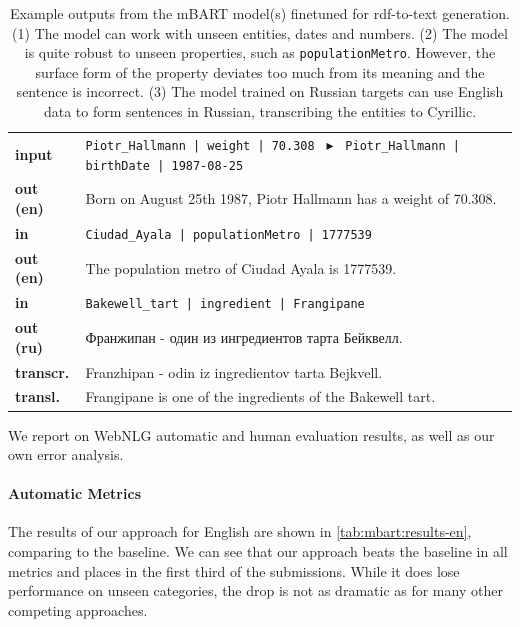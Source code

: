 \begin{table}[t]
    \footnotesize
    \centering
    \begin{tabular}{@{}lp{12.7cm}@{}}
        \textbf{input}    & \texttt{Piotr\_Hallmann | weight | 70.308 }  $\blacktriangleright$ \texttt{ Piotr\_Hallmann | birthDate | 1987-08-25} \\
        \textbf{out (en)} & Born on August 25th 1987, Piotr Hallmann has a weight of 70.308.                                                      \\
        \midrule
        \textbf{in}       & \texttt{Ciudad\_Ayala | populationMetro | 1777539}                                                                    \\
        \textbf{out (en)} & The population metro of Ciudad Ayala is 1777539.                                                                      \\
        \midrule
        \textbf{in}       & \texttt{Bakewell\_tart | ingredient | Frangipane}                                                                     \\
        \textbf{out (ru)} & Франжипан - один из ингредиентов тарта Бейквелл.                                                                      \\[0.1cm]
        \textbf{transcr.} & Franzhipan - odin iz ingredientov tarta Bejkvell.                                                                     \\
        \textbf{transl.}  & Frangipane is one of the ingredients of the Bakewell tart.                                                            \\
    \end{tabular}
    \caption{Example outputs from the mBART model(s) finetuned for \ac{rdf}-to-text generation. (1) The model can work with unseen entities, dates and numbers. (2) The model is quite robust to unseen properties, such as \texttt{populationMetro}. However, the surface form of the property deviates too much from its meaning and the sentence is incorrect. (3) The model trained on Russian targets can use English data to form sentences in Russian, transcribing the entities to Cyrillic.}
    \label{tab:mbart:examples}
\end{table}

We report on WebNLG automatic and human evaluation results, as well as our own error analysis.

\paragraph{Automatic Metrics}
The results of our approach for English are shown in \autoref{tab:mbart:results-en}, comparing to the baseline.
We can see that our approach beats the baseline in all metrics and places in the first third of the submissions. While it does lose performance on unseen categories, the drop is not as dramatic as for many other competing approaches.

